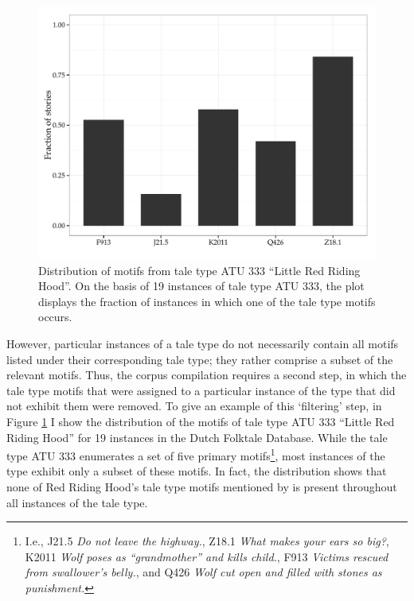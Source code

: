 \begin{figure}
  \centering
  \includegraphics[width=\textwidth]{images/atu-333-motifs.pdf}
  \caption{Distribution of motifs from tale type ATU 333 ``Little Red Riding Hood''. On the basis of 19 instances of tale type ATU 333, the plot displays the fraction of instances in which one of the tale type motifs occurs.}
  \label{fig:atu-333-motifs}
\end{figure}

However, particular instances of a tale type do not necessarily contain all motifs listed under their corresponding tale type; they rather comprise a subset of the relevant motifs. Thus, the corpus compilation requires a second step, in which the tale type motifs that were assigned to a particular instance of the type that did not exhibit them were removed. To give an example of this `filtering' step, in Figure \ref{fig:atu-333-motifs} I show the distribution of the motifs of tale type ATU 333 ``Little Red Riding Hood'' for 19 instances in the Dutch Folktale Database. While the tale type ATU 333 enumerates a set of five primary motifs\footnote{I.e., J21.5 \emph{Do not leave the highway.}, Z18.1 \emph{What makes your ears so big?}, K2011 \emph{Wolf poses as ``grandmother'' and kills child.}, F913 \emph{Victims rescued from swallower's belly.}, and Q426 \emph{Wolf cut open and filled with stones as punishment.}}, most instances of the type exhibit only a subset of these motifs. In fact, the distribution shows that none of Red Riding Hood's tale type motifs mentioned by \citeauthor{uther:2004} is present throughout all instances of the tale type.\autocite{uther:2004}

